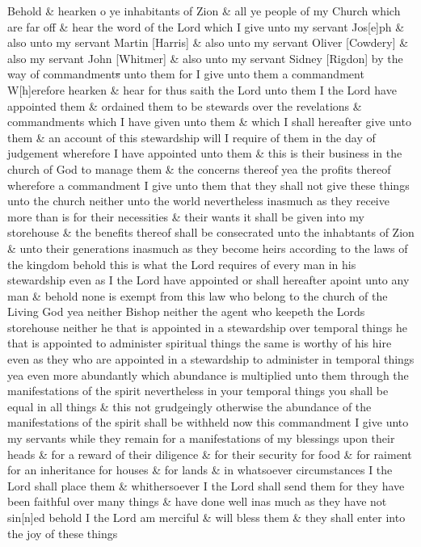 {				Behold \& hearken o ye inhabitants of Zion \& all ye people of my Church which are far off \& hear the word of the Lord which I give unto my servant Jos[e]ph \& also unto my servant Martin [Harris] \& also unto my servant Oliver [Cowdery] \& also my servant John [Whitmer] \& also unto my servant Sidney [Rigdon] by the way of commandment\sout{s} unto them for I give unto them a commandment W[h]erefore hearken \& hear for thus saith the Lord unto them I the Lord have appointed them \& ordained them to be stewards over the revelations \& commandments which I have given unto them \& which I shall hereafter give unto them \& an account of this stewardship will I require of them in the day of judgement wherefore I have appointed unto them \& this is their business in the church of God to manage them \& the concerns thereof yea the profits thereof wherefore a commandment I give unto them that they shall not give these things unto the church neither unto the world nevertheless inasmuch as they receive more than is for their necessities \& their wants it shall be given into my storehouse \& the benefits thereof shall be consecrated unto the inhabtants of Zion \& unto their generations inasmuch as they become heirs according to the laws of the kingdom behold this is what the Lord requires of every man in his stewardship even as I the Lord have appointed or shall hereafter apoint unto any man \& behold none is exempt from this law who belong to the church of the Living God yea neither Bishop neither the agent who keepeth the Lords storehouse neither he that is appointed in a stewardship over temporal things he that is appointed to administer spiritual things the same is worthy of his hire even as they who are appointed in a stewardship to administer in temporal things yea even more abundantly which abundance is multiplied unto them through the manifestations of the spirit nevertheless in your temporal things you shall be equal in all things \& this not grudgeingly otherwise the abundance of the manifestations of the spirit shall be withheld now this commandment I give unto my servants while they remain for a manifestations of my blessings upon their heads \& for a reward of their diligence \& for their security for food \& for raiment for an inheritance for houses \& for lands \& in whatsoever circumstances I the Lord shall place them \& whithersoever I the Lord shall send them for they have been faithful over many things \& have done well inas much as they have not sin[n]ed behold I the Lord am merciful \& will bless them \& they shall enter into the joy of these things
				
}
